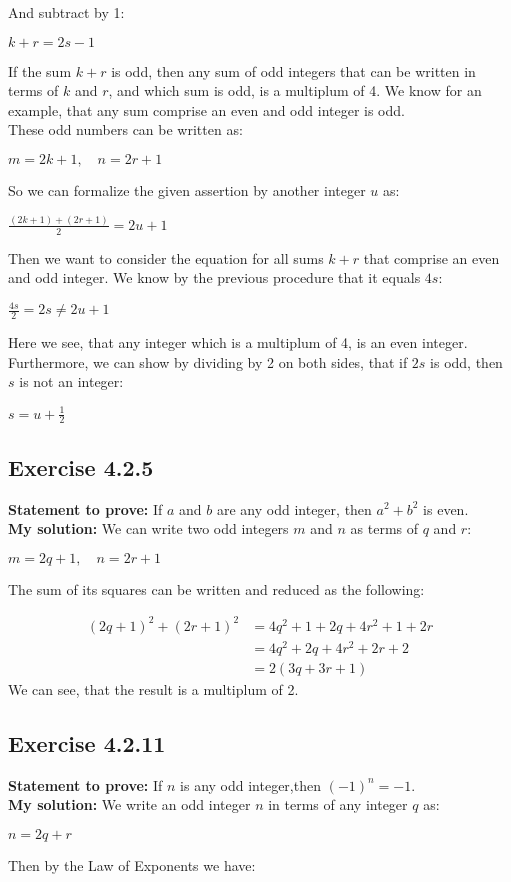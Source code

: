 \documentclass{article}
\newcommand{\cent}[1]{\begin{center}#1\end{center}}
\newcommand{\mAlign}[1]{\begin{align*}#1\end{align*}}
\newcommand{\Prove}{\textbf{Statement to prove: }}
\newcommand{\Solution}{\textbf{My solution: }}
\newcommand{\QED}{\boxed{}}
\newcommand{\Exercise}[1]{\subsection{Exercise #1}}
\begin{document}
	And subtract by 1:
	
	\cent{$k+r=2s-1$}
	
	If the sum $k+r$ is odd, then any sum of odd integers that can be written in terms of $k$ and $r$, and which sum is odd, is a multiplum of 4. We know for an example, that any sum comprise an even and odd integer is odd.\\
	
	These odd numbers can be written as:
		
	\cent{$m = 2k+1, \quad n = 2r+1 $}
	
	So we can formalize the given assertion by another integer $u$ as:
	
	\cent{$\frac{(2k+1) + (2r+1)}{2} = 2u +1$}
	
	Then we want to consider the equation for all sums $k+r$ that comprise an even and odd integer. We know by the previous procedure that it equals $4s$:
	
	\cent{$\frac{4s}{2} = 2s \neq 2u +1$}
	
	Here we see, that any integer which is a multiplum of 4, is an even integer. Furthermore, we can show by dividing by 2 on both sides, that if $2s$ is odd, then $s$ is not an integer:
	
	\cent{$s=u+\frac{1}{2}$}
	
	\QED
	
	\Exercise{4.2.5}
	\Prove
	If $a$ and $b$ are any odd integer, then $a^2 + b^2$ is even.\\
	
	\Solution
	We can write two odd integers $m$ and $n$ as terms of $q$ and $r$:
	\cent{$m = 2q+1, \quad n = 2r+1$}
	
	The sum of its squares can be written and reduced as the following:
	
	\mAlign{(2q+1)^2 + (2r+1)^2 &= 4q^2 + 1 + 2q + 4r^2 + 1 +2r \\
					&= 4q^2+2q + 4r^2 + 2r +2 \\
					&= 2(3q +3r +1)}
	We can see, that the result is a multiplum of 2.\\
	\QED
	
	\Exercise{4.2.11}
	
	\Prove
	If $n$ is any odd integer,then $(-1)^n = -1$.\\
	
	\Solution
	We write an odd integer $n$ in terms of any integer $q$ as:
	
	\cent{$n = 2q+r$}
	
	Then by the Law of Exponents we have:
	
\end{document}

